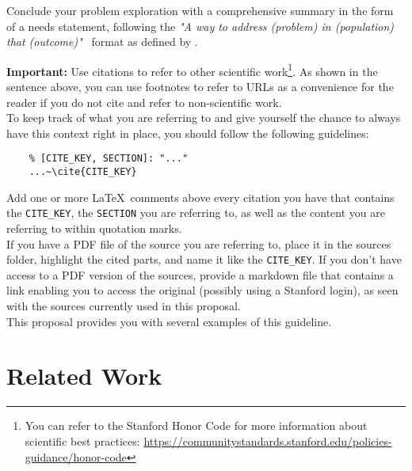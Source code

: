 \begin{tcolorbox}[breakable]
	Conclude your problem exploration with a comprehensive summary in the form of a needs statement, following the \textit{"A way to address (problem) in (population) that (outcome)"}~\cite{yock2015biodesign} format as defined by \citeauthor{yock2015biodesign}.
\end{tcolorbox}

\begin{tcolorbox}[breakable]
	\textbf{Important:} Use citations to refer to other scientific work\footnote{You can refer to the Stanford Honor Code for more information about scientific best practices: \url{https://communitystandards.stanford.edu/policies-guidance/honor-code}}.
	As shown in the sentence above, you can use footnotes to refer to URLs as a convenience for the reader if you do not cite and refer to non-scientific work.
	\\
	To keep track of what you are referring to and give yourself the chance to always have this context right in place, you should follow the following guidelines:
	\begin{verbatim}
	% [CITE_KEY, SECTION]: "..."
	...~\cite{CITE_KEY}
	\end{verbatim}
	Add one or more \LaTeX~comments above every citation you have that contains the \texttt{CITE\_KEY}, the \texttt{SECTION} you are referring to, as well as the content you are referring to within quotation marks.
	\\
	If you have a PDF file of the source you are referring to, place it in the sources folder, highlight the cited parts, and name it like the \texttt{CITE\_KEY}.
	If you don't have access to a PDF version of the sources, provide a markdown file that contains a link enabling you to access the original (possibly using a Stanford login), as seen with the sources currently used in this proposal.
	\\
	This proposal provides you with several examples of this guideline.
\end{tcolorbox}


\section*{Related Work}

